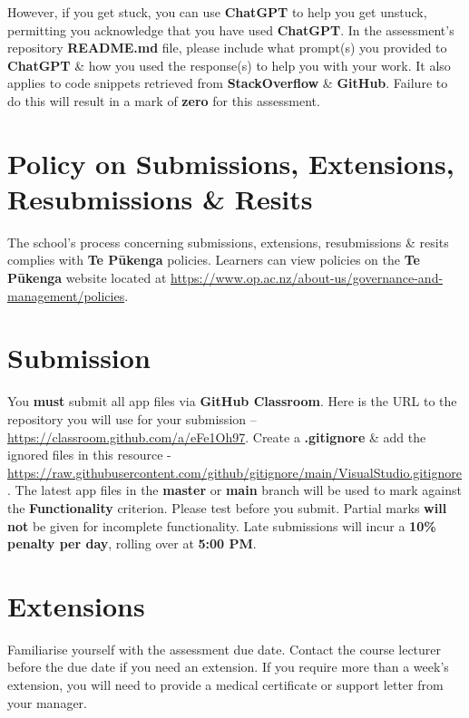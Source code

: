 \documentclass{article}
\begin{document}
 However, if you get stuck, you can use \textbf{ChatGPT} to help you get unstuck, permitting you acknowledge that you have used \textbf{ChatGPT}. In the assessment's repository \textbf{README.md} file, please include what prompt(s) you provided to \textbf{ChatGPT} \& how you used the response(s) to help you with your work. It also applies to code snippets retrieved from \textbf{StackOverflow} \& \textbf{GitHub}. Failure to do this will result in a mark of \textbf{zero} for this assessment.

\section*{Policy on Submissions, Extensions, Resubmissions \& Resits}
The school's process concerning submissions, extensions, resubmissions \& resits complies with \textbf{Te Pūkenga} policies. Learners can view policies on the \textbf{Te Pūkenga} website located at \href{https://www.op.ac.nz/about-us/governance-and-management/policies}{https://www.op.ac.nz/about-us/governance-and-management/policies}.

\section*{Submission}
You \textbf{must} submit all app files via \textbf{GitHub Classroom}. Here is the URL to the repository you will use for your submission – \href{https://classroom.github.com/a/eFe1Oh97}{https://classroom.github.com/a/eFe1Oh97}.  Create a \textbf{.gitignore} \& add the ignored files in this resource - \href{https://raw.githubusercontent.com/github/gitignore/main/VisualStudio.gitignore}{https://raw.githubusercontent.com/github/gitignore/main/VisualStudio.gitignore}. The latest app files in the \textbf{master} or \textbf{main} branch will be used to mark against the \textbf{Functionality} criterion. Please test before you submit. Partial marks \textbf{will not} be given for incomplete functionality. Late submissions will incur a \textbf{10\% penalty per day}, rolling over at \textbf{5:00 PM}.

\section*{Extensions}
Familiarise yourself with the assessment due date. Contact the course lecturer before the due date if you need an extension. If you require more than a week's extension, you will need to provide a medical certificate or support letter from your manager.
\end{document}
